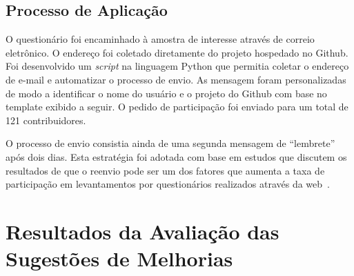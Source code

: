 \subsection{Processo de Aplicação}
\label{ssub:processo_de_aplicação}

O questionário foi encaminhado à amostra de interesse através de correio
eletrônico. O endereço foi coletado diretamente do projeto hospedado no Github.
Foi desenvolvido um \textit{script} na linguagem Python que permitia coletar o
endereço de e-mail e automatizar o processo de envio. As mensagem foram
personalizadas de modo a identificar o nome do usuário e o projeto do Github com
base no template exibido a seguir. O pedido de participação foi enviado para um
total de 121 contribuidores.







O processo de envio consistia ainda de uma segunda mensagem de ``lembrete'' após
dois dias. Esta estratégia foi adotada com base em estudos que discutem os
resultados de que o reenvio pode ser um dos fatores que aumenta a taxa de
participação em levantamentos por questionários realizados através da
web~\cite{fan2010factors}.

\section{Resultados da Avaliação das Sugestões de Melhorias}
\label{sec:resultados_avaliacao_sug_de_melhorias}

